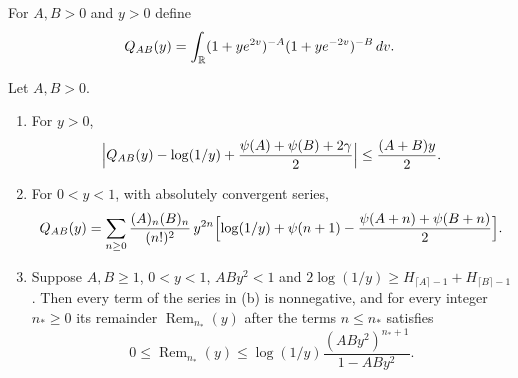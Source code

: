 For $A,B>0$ and $y>0$ define
\[
 Q_{AB}(y)=\int_\mathbb R(1+ye^{2v})^{-A}(1+ye^{-2v})^{-B}\,dv .
\]

\begin{lemma}\label{pf:hyperbola}
Let $A,B>0$.
\begin{enumerate}
\item[(a)] For $y>0$,
\begin{equation}\label{pf:elementary-hyperbola-error}
 \Bigl|Q_{AB}(y)-\log(1/y)+\frac{\psi(A)+\psi(B)+2\gamma}{2}\Bigr|
 \le\frac{(A+B)y}2 .
\end{equation}
\item[(b)] For $0<y<1$, with absolutely convergent series,
\[
 Q_{AB}(y)=\sum_{n\ge0}\frac{(A)_n(B)_n}{(n!)^2}\,y^{2n}
 \Bigl[\log(1/y)+\psi(n+1)-\frac{\psi(A+n)+\psi(B+n)}2\Bigr].
\]
\item[(c)] Suppose $A,B\ge1$, $0<y<1$, $ABy^2<1$ and
$2\log(1/y)\ge H_{\lceil A\rceil-1}+H_{\lceil B\rceil-1}$. Then every
term of the series in (b) is nonnegative, and for every integer
$n_*\ge0$ its remainder $\operatorname{Rem}_{n_*}(y)$ after the terms $n\le n_*$
satisfies
\[
 0\le\operatorname{Rem}_{n_*}(y)\le\log(1/y)\frac{(ABy^2)^{n_*+1}}{1-ABy^2}.
\]
\end{enumerate}
\end{lemma}

